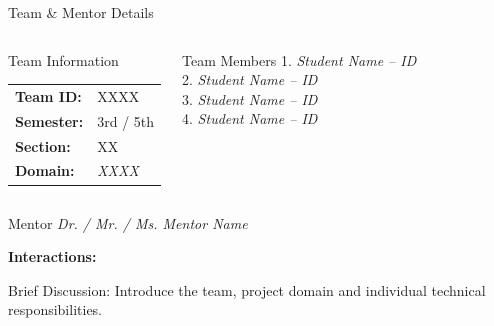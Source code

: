 \documentclass[aspectratio=169,11pt]{beamer}
\newcommand{\smallnote}[1]{%
\vspace{0.08cm}
{\scriptsize\color{GEUGrey}#1}
}
\newcommand{\placeholder}[1]{%
\textit{\color{GEUGrey}#1}
}
\begin{document}
\begin{frame}{Team \& Mentor Details}

\begin{columns}[T,totalwidth=\textwidth]


\begin{block}{Team Information}
\begin{tabular}{@{}ll@{}}
\textbf{Team ID:} & XXXX\\
\textbf{Semester:} & 3rd / 5th\\
\textbf{Section:} & XX\\
\textbf{Domain:} & \placeholder{XXXX}
\end{tabular}
\end{block}


\begin{block}{Team Members}
1.\quad \placeholder{Student Name -- ID}\\
2.\quad \placeholder{Student Name -- ID}\\
3.\quad \placeholder{Student Name -- ID}\\
4.\quad \placeholder{Student Name -- ID}
\end{block}

\end{columns}

\vspace{2mm}

\begin{block}{Mentor}
\placeholder{Dr. / Mr. / Ms. Mentor Name}
\hfill
\textbf{Interactions:} \underline{\hspace{12mm}}
\end{block}

\vfill

\smallnote{
Brief Discussion: Introduce the team, project domain and individual
technical responsibilities.
}

\end{frame}
\end{document}
